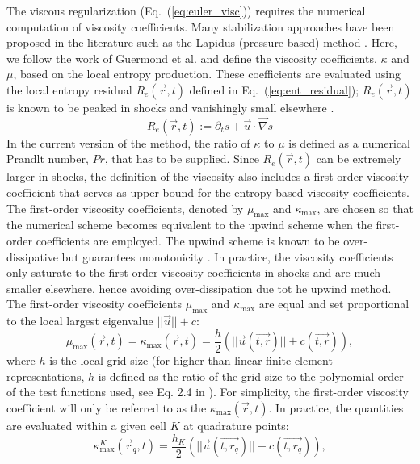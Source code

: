 \documentclass[preprint,10pt]{elsarticle}
\newcommand{\grad}{\vec{\nabla}}
\newcommand{\resi}{R_e}
\newcommand{\eqt}[1]{Eq.~(\ref{#1})}                     %
\begin{document}
The viscous regularization (\eqt{eq:euler_visc}) requires the numerical computation of viscosity coefficients. Many stabilization approaches have been proposed in the literature such as the Lapidus (pressure-based) method \cite{Lapidus_book, Lapidus_paper}. Here, we follow the work of Guermond et al. and define the viscosity coefficients, $\kappa$ and $\mu$, based on the local entropy production. These coefficients are evaluated using the local entropy residual $\resi(\vec{r},t)$ defined in \eqt{eq:ent_residual}; $\resi(\vec{r},t)$ is known to be peaked in shocks and vanishingly small elsewhere \cite{Toro}. 
%
\begin{equation}
\label{eq:ent_residual}
\resi(\vec{r}, t) := \partial_t s + \vec{u} \cdot \grad s
\end{equation}
%
In the current version of the method, the ratio of $\kappa$ to $\mu$ is defined as a numerical Prandlt number, $Pr$, that has to be supplied. Since $\resi(\vec{r},t)$ can be extremely larger in shocks, the definition of the viscosity also includes a first-order viscosity coefficient that serves as upper bound for the entropy-based viscosity coefficients. The first-order viscosity coefficients, denoted by $\mu_{\max}$ and $\kappa_{\max}$, are chosen so that the numerical scheme becomes equivalent to the upwind scheme when the first-order coefficients are employed. The upwind scheme is known to be over-dissipative but guarantees monotonicity \cite{Toro}. In practice, the viscosity coefficients only saturate to the first-order viscosity coefficients in shocks and are much smaller elsewhere, hence avoiding over-dissipation due tot he upwind method.  The first-order viscosity coefficients $\mu_{\max}$ and $\kappa_{\max}$ are equal and set proportional to the local largest eigenvalue $|| \vec{u} || + c $:
%
\begin{equation}
\label{eq:fo}
\mu_{\max}(\vec{r}, t) = \kappa_{\max}(\vec{r}, t) = \frac{h}{2} \left( || \vec{u}(\vec{t,r}) || + c(\vec{t,r}) \right),
\end{equation}
%
where $h$ is the local grid size (for higher than linear finite element representations, $h$ is defined as the ratio of the grid size to the polynomial order of the test functions used, see Eq. 2.4 in \cite{valentin}). For simplicity, the first-order viscosity coefficient will only be referred to as the $\kappa_{\max}(\vec{r}, t)$. In practice, the quantities are evaluated within a given cell $K$ at quadrature points:
%
\begin{equation}
\label{eq:fo_quad}
\kappa^K_{\max}(\vec{r}_q, t) = \frac{h_K}{2} \left( || \vec{u}(\vec{t,r_q}) || + c(\vec{t,r_q}) \right),
\end{equation}
\end{document}
